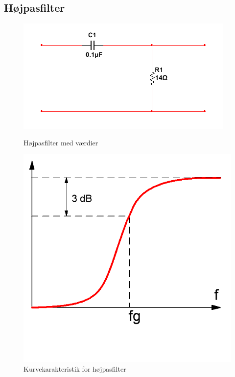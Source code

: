 \subsection{Højpasfilter}

\begin{figure}[htb]
  \begin{minipage}{0.45\textwidth}
    \centering
      \includegraphics[width=\textwidth]{billeder/HWdesign/HP_MV}
      \caption{Højpasfilter med værdier}
    \label{fig:HP_MV}
  \end{minipage}
  \hspace{0.1\textwidth}
  \begin{minipage}{0.45\textwidth}
    \centering
      \includegraphics[width=\textwidth]{billeder/HWdesign/HP_KURVE}
      \caption{Kurvekarakteristik for højpasfilter}
    \label{fig:HP_KURVE}
  \end{minipage}
\end{figure}

